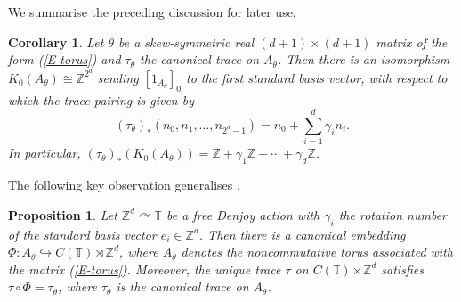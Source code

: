 \documentclass[11pt,a4paper,leqno]{amsart}
\newtheorem{prop}[thm]{Proposition}
\newtheorem{cor}[thm]{Corollary}
\theoremstyle{definition}
\theoremstyle{remark}
\numberwithin{equation}{section}
\theoremstyle{plain}
\newcommand{\Zb}{\mathbb{Z}}
\newcommand{\Tb}{\mathbb{T}}
\begin{document}
We summarise the preceding discussion for later use.   

\begin{cor}\label{C-trace}
	Let $\theta$ be a skew-symmetric real $(d+1)\times (d+1)$ matrix of the form (\ref{E-torus}) and $\tau_\theta$ the canonical trace on $A_\theta$. Then there is an isomorphism $K_0(A_\theta)\cong \Zb^{2^d}$ sending $[1_{A_\theta}]_0$ to the first standard basis vector, with respect to which the trace pairing is given by  
	\[
	(\tau_\theta)_*(n_0,n_1,\ldots,n_{2^{d}-1}) = n_0 + \sum_{i=1}^d \gamma_i n_i.
	\]
In particular, $(\tau_\theta)_*(K_0(A_\theta)) = \Zb + \gamma_1\Zb + \cdots + \gamma_d\Zb$. 
\end{cor}

The following key observation generalises \cite[Proposition 5.4]{PutSchSka86}.

\begin{prop}\label{P-embed}
	Let $\Zb^d \curvearrowright \Tb$ be a free Denjoy action with $\gamma_i$ the rotation number of the standard basis vector $e_i \in \Zb^d$. Then there is a canonical embedding $\Phi : A_\theta \hookrightarrow C(\Tb)\rtimes \Zb^d$, where $A_\theta$ denotes the noncommutative torus associated with the matrix (\ref{E-torus}). Moreover, the unique trace $\tau$ on $C(\Tb)\rtimes \Zb^d$ satisfies $\tau \circ \Phi = \tau_{\theta}$, where $\tau_{\theta}$ is the canonical trace on $A_\theta$. 
\end{prop}
\end{document}
